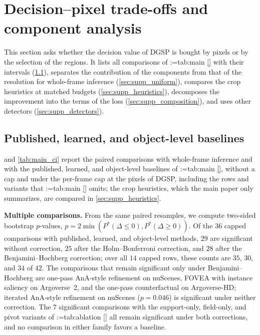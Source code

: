 \documentclass[10pt,letterpaper]{article}
\makeatletter
\newcommand{\method}{DGSP\xspace}
\theoremstyle{remark}
\theoremstyle{plain}
\theoremstyle{definition}
\DeclareRobustCommand{\mref}[1]{\def\mref@list{}\@for\mref@i:=#1\do{\ifx\mref@list\@empty\edef\mref@list{M-\mref@i}\else\edef\mref@list{\mref@list,M-\mref@i}\fi}%
  \edef\mref@cmd{\noexpand\cref*{\mref@list}}\mref@cmd}
\makeatother
\begin{document}
\section{Decision--pixel trade-offs and component analysis}
\label{sec:supp_tradeoff}

This section asks whether the decision value of \method is bought by pixels or by the selection of the regions.
It lists all comparisons of \mref{tab:main} with their intervals (\cref{sec:supp_allcomp}), separates the contribution of the components from that of the resolution for whole-frame inference (\cref{sec:supp_uniform}), compares the crop heuristics at matched budgets (\cref{sec:supp_heuristics}), decomposes the improvement into the terms of the loss (\cref{sec:supp_composition}), and uses other detectors (\cref{sec:supp_detectors}).

\subsection{Published, learned, and object-level baselines}
\label{sec:supp_allcomp}

 and \cref{tab:main_ci} report the paired comparisons with whole-frame inference and with the published, learned, and object-level baselines of \mref{tab:main}, without a cap and under the per-frame cap at the pixels of \method, including the rows and variants that \mref{tab:main} omits; the crop heuristics, which the main paper only summarizes, are compared in \cref{sec:supp_heuristics}.

\noindent\textbf{Multiple comparisons.}
From the same paired resamples, we compute two-sided bootstrap $p$-values, $p=2\min(P^*(\Delta\le0),P^*(\Delta\ge0))$.
Of the $36$ capped comparisons with published, learned, and object-level methods, $29$ are significant without correction, $25$ after the Holm--Bonferroni correction, and $28$ after the Benjamini--Hochberg correction; over all $14$ capped rows, these counts are $35$, $30$, and $34$ of $42$.
The comparisons that remain significant only under Benjamini--Hochberg are one-pass AnA-style refinement on nuScenes, FOVEA with instance saliency on Argoverse~2, and the one-pass counterfactual on Argoverse-HD; iterated AnA-style refinement on nuScenes ($p=0.046$) is significant under neither correction.
The $7$ significant comparisons with the support-only, field-only, and pivot variants of \mref{tab:ablation} all remain significant under both corrections, and no comparison in either family favors a baseline.
\end{document}
